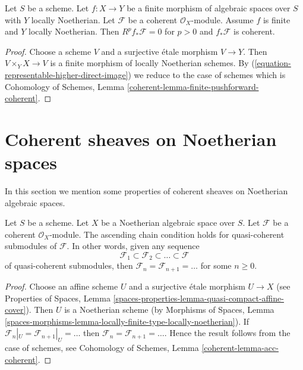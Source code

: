 \begin{lemma}
\label{lemma-finite-pushforward-coherent}
Let $S$ be a scheme. Let $f : X \to Y$ be a finite morphism of algebraic
spaces over $S$ with $Y$ locally Noetherian. Let $\mathcal{F}$ be a
coherent $\mathcal{O}_X$-module. Assume $f$ is finite and $Y$ locally
Noetherian. Then $R^pf_*\mathcal{F} = 0$ for $p > 0$ and
$f_*\mathcal{F}$ is coherent.
\end{lemma}

\begin{proof}
Choose a scheme $V$ and a surjective \'etale morphism $V \to Y$.
Then $V \times_Y X \to V$ is a finite morphism of locally Noetherian
schemes. By (\ref{equation-representable-higher-direct-image}) we reduce
to the case of schemes which is
Cohomology of Schemes, Lemma \ref{coherent-lemma-finite-pushforward-coherent}.
\end{proof}






\section{Coherent sheaves on Noetherian spaces}
\label{section-coherent-quasi-compact}

\noindent
In this section we mention some properties of coherent sheaves on
Noetherian algebraic spaces.

\begin{lemma}
\label{lemma-acc-coherent}
Let $S$ be a scheme. Let $X$ be a Noetherian algebraic space over $S$.
Let $\mathcal{F}$ be a coherent $\mathcal{O}_X$-module.
The ascending chain condition holds for quasi-coherent submodules
of $\mathcal{F}$. In other words, given any sequence
$$
\mathcal{F}_1 \subset \mathcal{F}_2 \subset \ldots \subset \mathcal{F}
$$
of quasi-coherent submodules, then
$\mathcal{F}_n = \mathcal{F}_{n + 1} = \ldots $ for some $n \geq 0$.
\end{lemma}

\begin{proof}
Choose an affine scheme $U$ and a surjective \'etale morphism $U \to X$
(see Properties of Spaces, Lemma
\ref{spaces-properties-lemma-quasi-compact-affine-cover}).
Then $U$ is a Noetherian scheme (by
Morphisms of Spaces, Lemma
\ref{spaces-morphisms-lemma-locally-finite-type-locally-noetherian}).
If $\mathcal{F}_n|_U = \mathcal{F}_{n + 1}|_U = \ldots$
then $\mathcal{F}_n = \mathcal{F}_{n + 1} = \ldots$.
Hence the result follows from the case of schemes, see
Cohomology of Schemes, Lemma \ref{coherent-lemma-acc-coherent}.
\end{proof}

